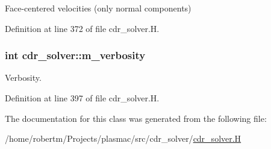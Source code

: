Face-\/centered velocities (only normal components) 



Definition at line 372 of file cdr\+\_\+solver.\+H.

\subsubsection[{\texorpdfstring{m\+\_\+verbosity}{m_verbosity}}]{\setlength{\rightskip}{0pt plus 5cm}int cdr\+\_\+solver\+::m\+\_\+verbosity\hspace{0.3cm}{\ttfamily [protected]}}\hypertarget{classcdr__solver_a79f63bdaae91aad5605c4d1694fe6f3f}{}\label{classcdr__solver_a79f63bdaae91aad5605c4d1694fe6f3f}


Verbosity. 



Definition at line 397 of file cdr\+\_\+solver.\+H.



The documentation for this class was generated from the following file\+:\begin{DoxyCompactItemize}
\item 
/home/robertm/\+Projects/plasmac/src/cdr\+\_\+solver/\hyperlink{cdr__solver_8H}{cdr\+\_\+solver.\+H}\end{DoxyCompactItemize}
